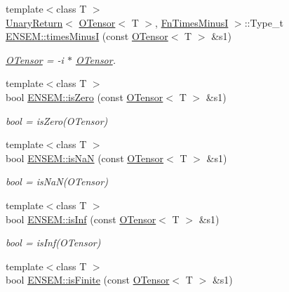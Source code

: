\begin{DoxyCompactItemize}
{\footnotesize template$<$class T $>$ }\\\mbox{\hyperlink{structENSEM_1_1UnaryReturn}{Unary\+Return}}$<$ \mbox{\hyperlink{classENSEM_1_1OTensor}{O\+Tensor}}$<$ T $>$, \mbox{\hyperlink{structENSEM_1_1FnTimesMinusI}{Fn\+Times\+MinusI}} $>$\+::Type\+\_\+t \mbox{\hyperlink{group__obstensor_ga2ff1b1b26805ce37116135e8474f4b36}{E\+N\+S\+E\+M\+::times\+MinusI}} (const \mbox{\hyperlink{classENSEM_1_1OTensor}{O\+Tensor}}$<$ T $>$ \&s1)
\begin{DoxyCompactList}\small\item\em \mbox{\hyperlink{classENSEM_1_1OTensor}{O\+Tensor}} = -\/i $\ast$ \mbox{\hyperlink{classENSEM_1_1OTensor}{O\+Tensor}}. \end{DoxyCompactList}\item 
{\footnotesize template$<$class T $>$ }\\bool \mbox{\hyperlink{group__obstensor_ga9520741647696623fb9f0d8398f50568}{E\+N\+S\+E\+M\+::is\+Zero}} (const \mbox{\hyperlink{classENSEM_1_1OTensor}{O\+Tensor}}$<$ T $>$ \&s1)
\begin{DoxyCompactList}\small\item\em bool = is\+Zero(\+O\+Tensor) \end{DoxyCompactList}\item 
{\footnotesize template$<$class T $>$ }\\bool \mbox{\hyperlink{group__obstensor_ga24d19fade61896ac0c88639bd7b00b5a}{E\+N\+S\+E\+M\+::is\+NaN}} (const \mbox{\hyperlink{classENSEM_1_1OTensor}{O\+Tensor}}$<$ T $>$ \&s1)
\begin{DoxyCompactList}\small\item\em bool = is\+Na\+N(\+O\+Tensor) \end{DoxyCompactList}\item 
{\footnotesize template$<$class T $>$ }\\bool \mbox{\hyperlink{group__obstensor_ga67d316c95a82bf37cc7607cd64e039a1}{E\+N\+S\+E\+M\+::is\+Inf}} (const \mbox{\hyperlink{classENSEM_1_1OTensor}{O\+Tensor}}$<$ T $>$ \&s1)
\begin{DoxyCompactList}\small\item\em bool = is\+Inf(\+O\+Tensor) \end{DoxyCompactList}\item 
{\footnotesize template$<$class T $>$ }\\bool \mbox{\hyperlink{group__obstensor_ga79f475f3909487c15b04b4561acc06ef}{E\+N\+S\+E\+M\+::is\+Finite}} (const \mbox{\hyperlink{classENSEM_1_1OTensor}{O\+Tensor}}$<$ T $>$ \&s1)

\end{DoxyCompactItemize}
